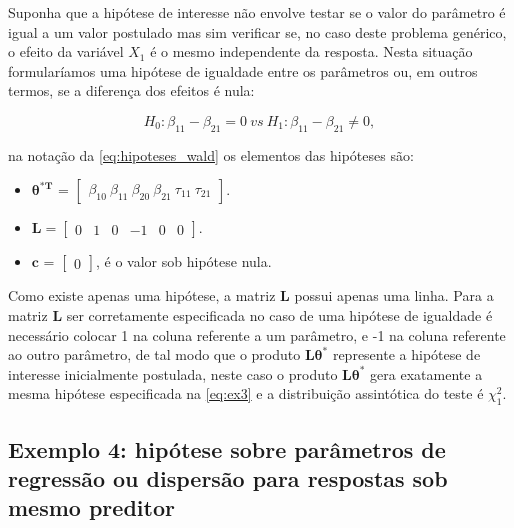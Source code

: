 Suponha que a hipótese de interesse não envolve testar se o valor do parâmetro é igual a um valor postulado mas sim verificar se, no caso deste problema genérico, o efeito da variável $X_1$ é o mesmo independente da resposta. Nesta situação formularíamos uma hipótese de igualdade entre os parâmetros ou, em outros termos, se a diferença dos efeitos é nula:

\begin{equation}
\label{eq:ex3}
H_0: \beta_{11} - \beta_{21} = 0 \ vs \ H_1: \beta_{11} - \beta_{21} \neq 0,
\end{equation}

\noindent na notação da \autoref{eq:hipoteses_wald} os elementos das hipóteses são:

\begin{itemize}
  
  \item $\boldsymbol{\theta^{*T}}$ = $\begin{bmatrix} \beta_{10} \  \beta_{11} \ \beta_{20} \ \beta_{21} \ \tau_{11} \ \tau_{21} \end{bmatrix}$.


\item $\boldsymbol{L} = \begin{bmatrix} 0 & 1 & 0 & -1 & 0 & 0  \end{bmatrix}.$
 
\item $\boldsymbol{c}$ = $\begin{bmatrix} 0 \end{bmatrix}$, é o valor sob hipótese nula. 

\end{itemize}

Como existe apenas uma hipótese, a matriz $\boldsymbol{L}$ possui apenas uma linha. Para a matriz $\boldsymbol{L}$ ser corretamente especificada no caso de uma hipótese de igualdade é necessário colocar 1 na coluna referente a um parâmetro, e -1 na coluna referente ao outro parâmetro, de tal modo que o produto $\boldsymbol{L}\boldsymbol{\theta^{*}}$ represente a hipótese de interesse inicialmente postulada, neste caso o produto $\boldsymbol{L}\boldsymbol{\theta^{*}}$ gera exatamente a mesma hipótese especificada na \autoref{eq:ex3} e a distribuição assintótica do teste é $\chi^2_1$.

\subsection{Exemplo 4: hipótese sobre parâmetros de regressão ou dispersão para respostas sob mesmo preditor}\label{sec:sec_ex4}

